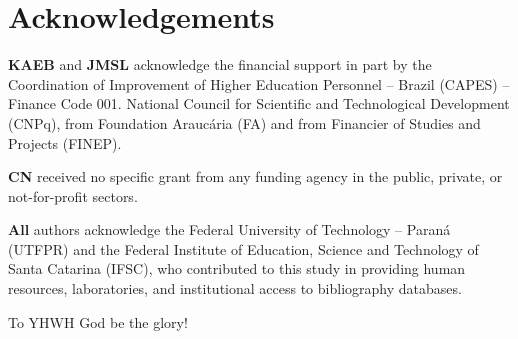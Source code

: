 \section*{Acknowledgements}

    \textbf{KAEB}  and  \textbf{JMSL}  acknowledge  the  financial  support  in  part   by   the
    Coordination of Improvement of Higher Education Personnel -- Brazil (CAPES) -- Finance  Code
    001. National Council for Scientific and Technological Development (CNPq),  from  Foundation
    Araucária (FA) and from Financier of Studies and Projects (FINEP).

    \textbf{CN} received no specific grant from any funding agency in the  public,  private,  or
    not-for-profit sectors.

    \textbf{All} authors acknowledge the Federal University of Technology -- Paraná (UTFPR)  and
    the Federal Institute of Education, Science and Technology of  Santa  Catarina  (IFSC),  who
    contributed to this study in providing  human  resources,  laboratories,  and  institutional
    access to bibliography databases.

    To YHWH God be the glory!


